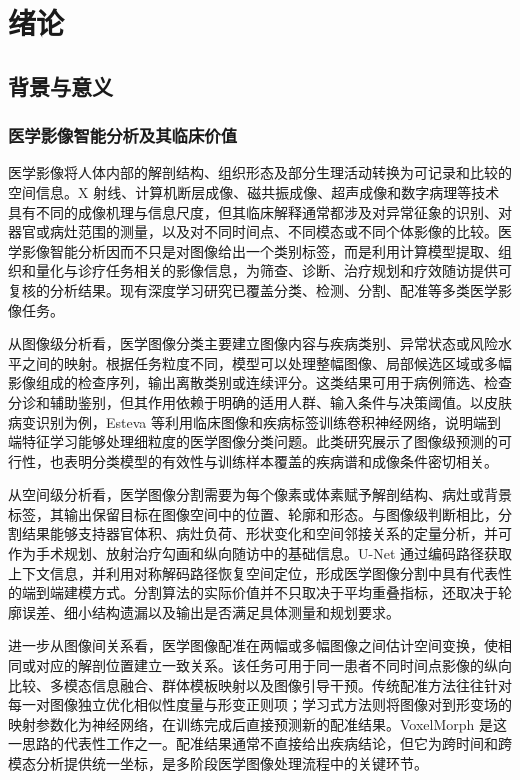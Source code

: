 \chapter{绪论}
\label{chap:introduction}
\raggedbottom

\section{背景与意义}
\label{sec:intro-background}

\subsection{医学影像智能分析及其临床价值}
\label{subsec:intro-medical-imaging-value}

医学影像将人体内部的解剖结构、组织形态及部分生理活动转换为可记录和比较的空间信息。X 射线、计算机断层成像、磁共振成像、超声成像和数字病理等技术具有不同的成像机理与信息尺度，但其临床解释通常都涉及对异常征象的识别、对器官或病灶范围的测量，以及对不同时间点、不同模态或不同个体影像的比较。医学影像智能分析因而不只是对图像给出一个类别标签，而是利用计算模型提取、组织和量化与诊疗任务相关的影像信息，为筛查、诊断、治疗规划和疗效随访提供可复核的分析结果。现有深度学习研究已覆盖分类、检测、分割、配准等多类医学影像任务\cite{litjens2017survey}。

从图像级分析看，医学图像分类主要建立图像内容与疾病类别、异常状态或风险水平之间的映射。根据任务粒度不同，模型可以处理整幅图像、局部候选区域或多幅影像组成的检查序列，输出离散类别或连续评分。这类结果可用于病例筛选、检查分诊和辅助鉴别，但其作用依赖于明确的适用人群、输入条件与决策阈值。以皮肤病变识别为例，Esteva 等利用临床图像和疾病标签训练卷积神经网络，说明端到端特征学习能够处理细粒度的医学图像分类问题\cite{esteva2017dermatologist}。此类研究展示了图像级预测的可行性，也表明分类模型的有效性与训练样本覆盖的疾病谱和成像条件密切相关。

从空间级分析看，医学图像分割需要为每个像素或体素赋予解剖结构、病灶或背景标签，其输出保留目标在图像空间中的位置、轮廓和形态。与图像级判断相比，分割结果能够支持器官体积、病灶负荷、形状变化和空间邻接关系的定量分析，并可作为手术规划、放射治疗勾画和纵向随访中的基础信息。U-Net 通过编码路径获取上下文信息，并利用对称解码路径恢复空间定位，形成医学图像分割中具有代表性的端到端建模方式\cite{ronneberger2015unet}。分割算法的实际价值并不只取决于平均重叠指标，还取决于轮廓误差、细小结构遗漏以及输出是否满足具体测量和规划要求。

进一步从图像间关系看，医学图像配准在两幅或多幅图像之间估计空间变换，使相同或对应的解剖位置建立一致关系。该任务可用于同一患者不同时间点影像的纵向比较、多模态信息融合、群体模板映射以及图像引导干预。传统配准方法往往针对每一对图像独立优化相似性度量与形变正则项；学习式方法则将图像对到形变场的映射参数化为神经网络，在训练完成后直接预测新的配准结果。VoxelMorph 是这一思路的代表性工作之一\cite{balakrishnan2019voxelmorph}。配准结果通常不直接给出疾病结论，但它为跨时间和跨模态分析提供统一坐标，是多阶段医学图像处理流程中的关键环节。

